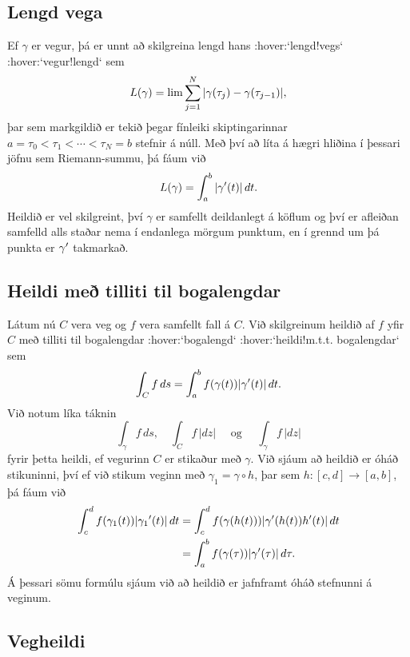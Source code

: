 \subsection*{Lengd vega}


Ef  $\gamma$ er vegur, þá er unnt að skilgreina lengd
hans :hover:`lengd!vegs` :hover:`vegur!lengd` sem 
$$
L(\gamma)=\lim \sum_{j=1}\sp N |\gamma(\tau_j)-\gamma(\tau_{j-1})|,
$$
þar sem markgildið er tekið þegar fínleiki skiptingarinnar
$a=\tau_0<\tau_1<\cdots<\tau_N=b$ stefnir á núll.  Með því að líta á
hægri hliðina í þessari jöfnu sem
Riemann-summu, þá fáum við
 $$L(\gamma)=\int_a\sp b |\gamma{\sp{\prime}}(t)| \, dt.
 $$
Heildið er vel skilgreint, því $\gamma$ er samfellt deildanlegt á
köflum  og því er afleiðan samfelld alls staðar nema í endanlega
mörgum punktum, en í grennd um þá punkta er $\gamma{\sp{\prime}}$ takmarkað.  

\subsection*{Heildi með tilliti til bogalengdar}


Látum nú $C$ vera  veg og $f$ vera samfellt fall á $C$.  Við
skilgreinum  heildið af $f$ yfir $C$ með tilliti til
bogalengdar :hover:`bogalengd` :hover:`heildi!m.t.t. bogalengdar` sem 
 $$\int_Cf \, ds = \int_a\sp b f(\gamma(t)) |\gamma{\sp{\prime}}(t)|\, dt.
 $$
Við notum líka táknin
$$\int_\gamma f\, ds,  \quad \int_C f\, |dz| \quad \text { og }
\quad \int_\gamma f\, |dz|
$$
fyrir þetta heildi, ef vegurinn $C$ er stikaður með $\gamma$.  Við
sjáum að heildið er óháð stikuninni, því ef við stikum veginn með
$\gamma_1=\gamma\circ h$, þar sem $h:[c,d]\to [a,b]$, þá  fáum við
\begin{align*}
\int_c\sp d f(\gamma_1(t)) |\gamma_1{\sp{\prime}}(t)|\, dt&=
\int_c\sp d f(\gamma(h(t))) |\gamma{\sp{\prime}}(h(t))h{\sp{\prime}}(t)|\, dt\\
&=
\int_a\sp bf(\gamma(\tau))|\gamma{\sp{\prime}}(\tau)| \, d\tau.
\end{align*}
{Á} þessari sömu formúlu sjáum við að heildið er jafnframt óháð
stefnunni á veginum.  

\subsection*{Vegheildi}

